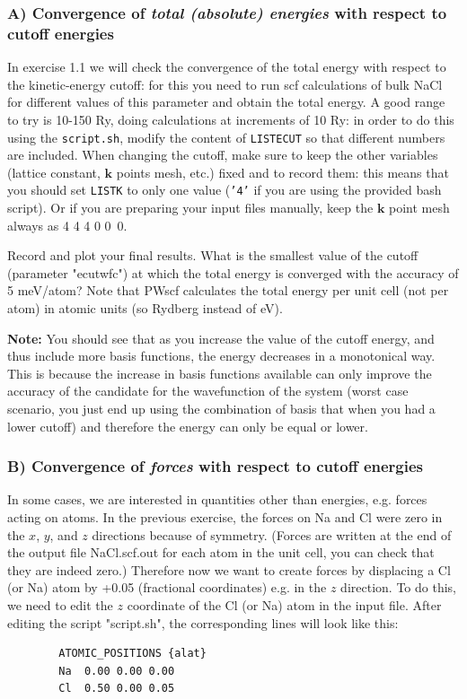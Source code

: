 \documentclass[12pt]{article}
\begin{document}
\subsubsection*{A) Convergence of {\it total (absolute) energies} with respect to cutoff energies}

In exercise 1.1 we will check the convergence of the total energy with respect to the
kinetic-energy cutoff: for this you need to run scf calculations of bulk NaCl for
different values of this parameter and obtain the total energy.
A good range to try is 10-150 Ry, doing calculations at increments of 10 Ry: in order
to do this using the {\tt script.sh}, modify the content of {\tt LISTECUT} so that different
numbers are included.
When changing the cutoff, make sure to keep the other variables (lattice constant,
$\mathbf{k}$ points mesh, etc.) fixed and to record them: this means that you should
set {\tt LISTK} to only one value ({\tt '4'} if you are using the provided bash script).
Or if you are preparing your input files manually, keep the $\mathbf{k}$ point mesh
always as 4 4 4  0 0~0.

Record and plot your final results.
What is the smallest value of the cutoff (parameter "ecutwfc") at which the total energy is converged with the accuracy of 5 meV/atom?
Note that PWscf calculates the total energy per unit cell (not per atom) in atomic units
(so Rydberg instead of eV).

{\bf Note:} You should see that as you increase the value of the cutoff energy, and
thus include more basis functions, the energy decreases in a monotonical way.
This is because the increase in basis functions available can only improve the accuracy
of the candidate for the wavefunction of the system (worst case scenario, you just end
up using the combination of basis that when you had a lower cutoff) and therefore the
energy can only be equal or lower.


\vspace{6mm}
\subsubsection*{B) Convergence of {\it forces} with respect to cutoff energies}

In some cases, we are interested in quantities other than energies, e.g. forces acting on atoms.
In the previous exercise, the forces on Na and Cl were zero in the $x$, $y$, and $z$
directions because of symmetry.
(Forces are written at the end of the output file NaCl.scf.out for each atom in the unit cell, you can check that they are indeed zero.)
Therefore now we want to create forces by displacing a Cl (or Na) atom by +0.05
(fractional coordinates) e.g. in the $z$ direction.
To do this, we need to edit the $z$ coordinate of the Cl (or Na) atom in the input file.
After editing the script "script.sh", the corresponding lines will look like this:
\newpage
\begin{verbatim}
        ATOMIC_POSITIONS {alat}
        Na  0.00 0.00 0.00
        Cl  0.50 0.00 0.05
\end{verbatim}
\end{document}
